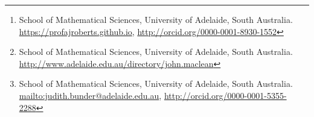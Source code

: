 


\author{A.~J.~Roberts%
\thanks{School of Mathematical Sciences, University of Adelaide, South Australia.
\url{https://profajroberts.github.io},
\url{http://orcid.org/0000-0001-8930-1552}}
%
\and John~Maclean%
\thanks{School of Mathematical Sciences, University of Adelaide, South Australia.
\url{http://www.adelaide.edu.au/directory/john.maclean}}
%
\and J.~E.~Bunder%
\thanks{School of Mathematical Sciences, University of Adelaide, South Australia.
\protect\url{mailto:judith.bunder@adelaide.edu.au},
\protect\url{http://orcid.org/0000-0001-5355-2288}}
%
}

\date{\today}

\renewcommand{\and}{\hspace{2em plus 1em minus 1em}}


\usepackage[T1]{fontenc}
\usepackage[dvipsnames]{xcolor}


\usepackage{pgfplots} 
\pgfplotsset{compat=newest} %
\usetikzlibrary{decorations.markings}
\usetikzlibrary{shapes,arrows,fit}
\usetikzlibrary{positioning}

\def\figurename{\em Figure}

\usepackage{fancyvrb}
\newenvironment{matlab}%
    {\Verbatim[numbers=left,firstnumber=\the\inputlineno]}%
    {\endVerbatim}
\makeatletter
\def\fancyvrbStartStop{%
  \edef\FancyVerbStartString{\@percentchar\@charrb} 
  \edef\FancyVerbStopString{\@percentchar\@charlb} }
\makeatother


\usepackage{natbib}

\AtBeginDocument{\let\harvardurl\url}

\usepackage{versions}
\newenvironment{devMan}{}{} %
\newenvironment{userMan}{}{} %


\usepackage{url,microtype,amsmath,amssymb,defns,graphicx,hyperref,doi}
\hypersetup{colorlinks
    ,linkcolor=RoyalBlue,citecolor=RoyalBlue,pagecolor=RoyalBlue%
    ,urlcolor=magenta,filecolor=magenta,breaklinks%
    ,dvips,bookmarks,bookmarksopen}
\makeatletter
\AtBeginDocument{{\def\and{, }\def\thanks#1{}%
  \hypersetup{
    pdfauthor={\@author},
    pdftitle={\@title}}}
    }
\makeatother
\usepackage[capitalise,nameinlink,noabbrev]{cleveref}

